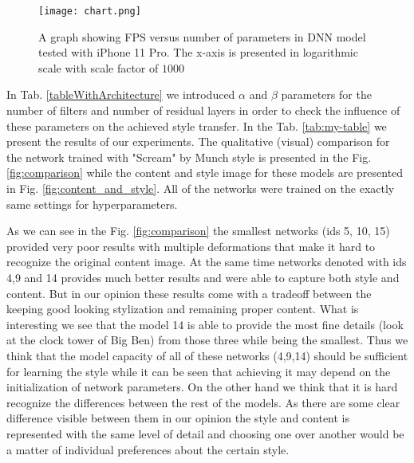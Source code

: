 \documentclass[a4paper,conference]{IEEEtran}
\newcommand{\ResidualLayerNumber}{\beta}
\begin{document}
\begin{figure}[ht!]
\caption{A graph showing FPS versus number of parameters in DNN model tested with iPhone 11 Pro. The x-axis is presented in logarithmic scale with scale factor of $1000$}
\label{graphFPS}
\centering
\texttt{[image: chart.png]}
\end{figure}



In Tab. \ref{tableWithArchitecture} we introduced $\alpha$ and $\ResidualLayerNumber$  parameters for the number of filters and number of residual layers in order to check the influence of these parameters on the achieved style transfer. In the Tab. \ref{tab:my-table} we present the results of our experiments. The qualitative (visual) comparison for the network trained with "Scream" by Munch style is presented in the Fig. \ref{fig:comparison} while the content and style image for these models are presented in Fig. \ref{fig:content_and_style}. All of the networks were trained on the exactly same settings for hyperparameters.

As we can see in the Fig. \ref{fig:comparison} the smallest networks (ids 5, 10, 15) provided very poor results with multiple deformations that make it hard to recognize the original content image. At the same time networks denoted with ids 4,9 and 14 provides much better results and were able to capture both style and content. But in our opinion these results come with a tradeoff between the keeping good looking stylization and remaining proper content. What is interesting we see that the model 14 is able to provide the most fine details (look at the clock tower of Big Ben) from those three while being the smallest. Thus we think that the model capacity of all of these networks (4,9,14) should be sufficient for learning the style while it can be seen that achieving it may depend on the initialization of network parameters. On the other hand we think that it is hard recognize the differences between the rest of the models. As there are some clear difference visible between them in our opinion the style and content is represented with the same level of detail and choosing one over another would be a matter of individual preferences about the certain style. 
\end{document}
